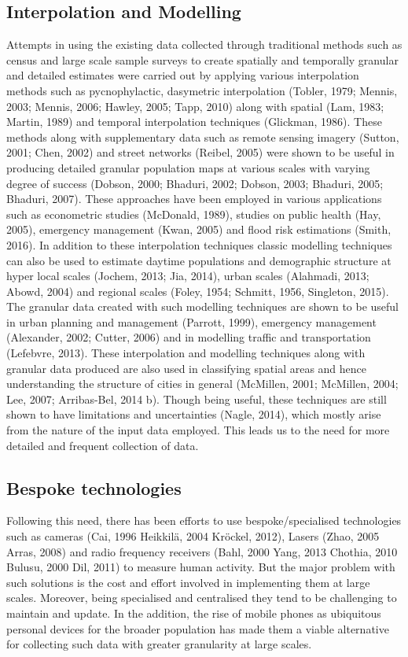 \subsection{Interpolation and Modelling}
Attempts in using the existing data collected through traditional methods such as census and large scale sample surveys to create spatially and temporally granular and detailed estimates were carried out by applying various interpolation methods such as pycnophylactic, dasymetric interpolation (Tobler, 1979; Mennis, 2003; Mennis, 2006; Hawley, 2005; Tapp, 2010) along with spatial (Lam, 1983; Martin, 1989) and temporal interpolation techniques (Glickman, 1986).
These methods along with supplementary data such as remote sensing imagery (Sutton, 2001; Chen, 2002) and street networks (Reibel, 2005) were shown to be useful in producing detailed granular population maps at various scales with varying degree of success (Dobson, 2000; Bhaduri, 2002; Dobson, 2003; Bhaduri, 2005; Bhaduri, 2007).
These approaches have been employed in various applications such as econometric studies (McDonald, 1989), studies on public health (Hay, 2005), emergency management (Kwan, 2005) and flood risk estimations (Smith, 2016).
In addition to these interpolation techniques classic modelling techniques can also be used to estimate daytime populations and demographic structure at hyper local scales (Jochem, 2013; Jia, 2014), urban scales (Alahmadi, 2013; Abowd, 2004) and regional scales (Foley, 1954; Schmitt, 1956, Singleton, 2015).
The granular data created with such modelling techniques are shown to be useful in urban planning and management (Parrott, 1999), emergency management (Alexander, 2002; Cutter, 2006) and in modelling traffic and transportation (Lefebvre, 2013).
These interpolation and modelling techniques along with granular data produced are also used in classifying spatial areas and hence understanding the structure of cities in general (McMillen, 2001; McMillen, 2004; Lee, 2007; Arribas-Bel, 2014 b).
Though being useful, these techniques are still shown to have limitations and uncertainties (Nagle, 2014), which mostly arise from the nature of the input data employed.
This leads us to the need for more detailed and frequent collection of data.

\subsection{Bespoke technologies}

Following this need, there has been efforts to use bespoke/specialised technologies such as cameras (Cai, 1996 Heikkilä, 2004 Kröckel, 2012), Lasers (Zhao, 2005 Arras, 2008) and radio frequency receivers  (Bahl, 2000 Yang, 2013 Chothia, 2010 Bulusu, 2000 Dil, 2011) to measure human activity.
But the major problem with such solutions is the cost and effort involved in implementing them at large scales.
Moreover, being specialised and centralised they tend to be challenging to maintain and update.
In the addition, the rise of mobile phones as ubiquitous personal devices for the broader population has made them a viable alternative for collecting such data with greater granularity at large scales.

